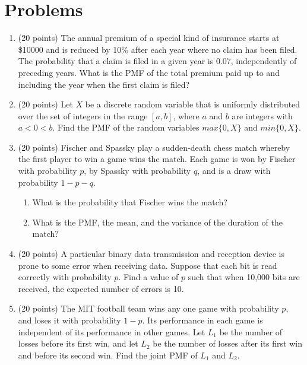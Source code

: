\documentclass[12pt, oneside]{article}
\begin{document}
\section{Problems}
\begin{enumerate}

\item (20 points) The annual premium of a special kind of insurance starts at \$10000 and is reduced by 10\% after each year where no claim has been filed. The probability that a claim is filed in a given year is 0.07, independently of preceding years. What is the PMF of the total premium paid up to and including the year when the first claim is filed? 
\newpage
\item (20 points) Let $X$ be a discrete random variable that is uniformly distributed over the set of integers in the range $[a, b]$, where $a$ and $b$ are integers with $a<0<b$. Find the PMF of the random variables $max\{0,X\}$ and $min\{0,X\}$.
\newpage
\item (20 points) Fischer and Spassky play a sudden-death chess match whereby the first player to win a game wins the match. Each game is won by Fischer with probability $p$, by Spassky with probability $q$, and is a draw with probability $1-p-q$.
\begin{enumerate}
    \item What is the probability that Fischer wins the match?
    \item What is the PMF, the mean, and the variance of the duration of the match?
\end{enumerate}
\newpage
\item (20 points) A particular binary data transmission and reception device is prone to some error when receiving data. Suppose that each bit is read correctly with probability $p$. Find a value of $p$ such that when 10,000 bits are received, the expected number of errors is 10.
\newpage
\item (20 points) The MIT football team wins any one game with probability $p$, and loses it with probability $1-p$. Its performance in each game is independent of its performance in other games. Let $L_1$ be the number of losses before its first win, and let $L_2$ be the number of losses after its first win and before its second win. Find the joint PMF of $L_1$ and $L_2$.
\end{enumerate}
\end{document}
